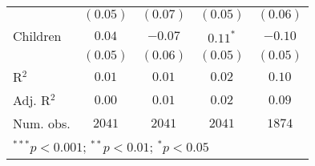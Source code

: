 \begin{table}[h]
\begin{center}
\begin{tabular}{l c c c c}
                  & $(0.05)$     & $(0.07)$     & $(0.05)$      & $(0.06)$      \\
Children          & $0.04$       & $-0.07$      & $0.11^{*}$    & $-0.10$       \\
                  & $(0.05)$     & $(0.06)$     & $(0.05)$      & $(0.05)$      \\
\midrule
R$^2$             & $0.01$       & $0.01$       & $0.02$        & $0.10$        \\
Adj. R$^2$        & $0.00$       & $0.01$       & $0.02$        & $0.09$        \\
Num. obs.         & $2041$       & $2041$       & $2041$        & $1874$        \\
\bottomrule
\multicolumn{5}{l}{\scriptsize{$^{***}p<0.001$; $^{**}p<0.01$; $^{*}p<0.05$}}
\end{tabular}
\label{tab:panelprivacyattitudes}
\end{center}
\end{table}
